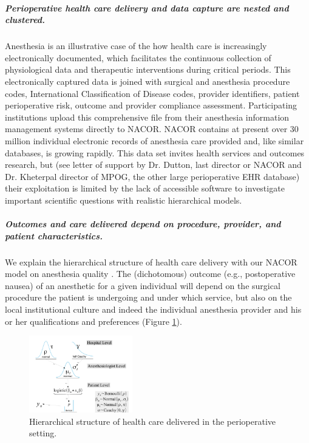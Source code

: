 \documentclass[11pt,notitlepage]{article}
\begin{document}
\subparagraph*{Perioperative health care delivery and data capture are nested and clustered.}
Anesthesia is an illustrative case of the how health care is increasingly 
electronically documented, which facilitates the continuous collection of 
physiological data and therapeutic interventions during critical periods. 
This electronically captured data 
is joined with surgical and anesthesia procedure codes, International 
Classification of Disease codes, provider identifiers, patient perioperative 
risk, outcome and provider compliance assessment. Participating institutions upload 
this comprehensive file from their anesthesia information management systems
directly to NACOR. NACOR contains at present over 30 million individual 
electronic records of anesthesia care provided and, like similar databases, is 
growing rapidly. This data set invites health services and outcomes research, 
but (see letter of support by Dr. Dutton, last director or 
NACOR and Dr. Kheterpal director of MPOG, the other large perioperative EHR 
database) their exploitation is limited by the lack of accessible software to investigate 
important scientific questions with realistic hierarchical models.

\subparagraph*{Outcomes and care delivered depend on procedure, provider, and patient characteristics.} 
We explain the hierarchical structure of health care delivery with our NACOR model on anesthesia quality \cite{AndreaeWhite2015}. 
The (dichotomous) outcome (e.g., postoperative nausea) of 
an anesthetic for a given individual will depend on the surgical procedure the patient is undergoing and under 
which service, but also on the local institutional culture and indeed the individual anesthesia provider and 
his or her qualifications and preferences (Figure \ref{fig:NACOR}).

\begin{figure} 
\vspace*{-12pt}
\includegraphics[width=0.4\textwidth]{Figures/DistrogramNACOR.pdf} 
\caption{Hierarchical structure of health care delivered in the perioperative setting.}
\label{fig:NACOR}
\vspace*{-12pt}
\end{figure} 
\end{document}
